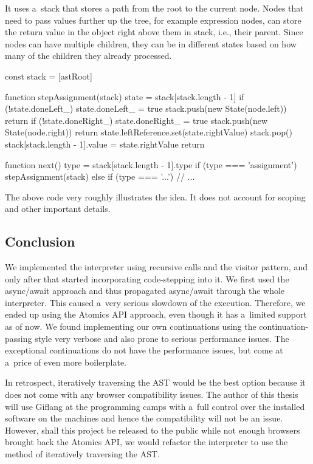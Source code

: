 It uses a~stack that stores a path from the root to the current node. Nodes that need to pass values further up the tree, for example expression nodes, can store
the return value in the object right above them in stack, i.e., their parent. Since nodes can have multiple children, they can be in different states
based on how many of the children they already processed.

\begin{code}
const stack = [astRoot]

function stepAssignment(stack) {
    state = stack[stack.length - 1]
    if (!state.doneLeft_) {
        state.doneLeft_ = true
        stack.push(new State(node.left))
        return
    }
    if (!state.doneRight_) {
        state.doneRight_ = true
        stack.push(new State(node.right))
        return
    }
    state.leftReference.set(state.rightValue)
    stack.pop()
    stack[stack.length - 1].value = state.rightValue
    return
}

function next() {
    type = stack[stack.length - 1].type
    if (type === 'assignment') {
        stepAssignment(stack)
    } else if (type === '...') {
        // ...
    }
}
\end{code}

The above code very roughly illustrates the idea. It does not account for scoping and other important details.

\subsection*{Conclusion}
We implemented the interpreter using recursive calls and the visitor pattern, and only after that started incorporating code-stepping into it. We first used
the async/await approach and thus propagated async/await through the whole interpreter. This caused a~very serious slowdown of the execution. Therefore, we ended
up using the Atomics API approach, even though it has a~limited support as of now. We found implementing our own continuations using the continuation-passing style
very verbose and also prone to serious performance issues. The exceptional continuations do not have the performance issues, but come at a~price of even more boilerplate.

In retrospect, iteratively traversing the AST would be the best option because it does not come with any browser compatibility issues. The author of this thesis
will use Giflang at the programming camps with a~full control over the installed software on the machines and hence the compatibility will not be an issue.
However, shall this project be released to the public while not enough browsers brought back the Atomics API, we would refactor the interpreter to
use the method of iteratively traversing the AST.

